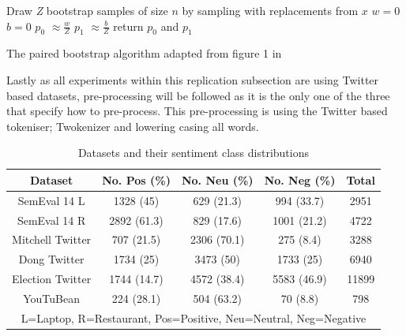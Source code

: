 \begin{algorithm}
    Draw \textit{Z} bootstrap samples of size $n$ by sampling with replacements from $x$\;
    $w = 0$\;
    $b = 0$\;
    $p_0$ $\approx \frac{w}{Z}$\;
    $p_1$ $\approx \frac{b}{Z}$\;
    return $p_0$ and $p_1$\;
    \caption{The paired bootstrap algorithm adapted from figure 1 in \citet{repro_berg_2012}}
    \label{algo:repro_bootstrap}
\end{algorithm}
Lastly as all experiments within this replication subsection are using Twitter based datasets, \citet{repro_vo_2015} pre-processing will be followed as it is the only one of the three that specify how to pre-process. This pre-processing is using the Twitter based tokeniser; Twokenizer \citep{repro_gimpel_2011} and lowering casing all words.

\begin{table}[]
    \centering
    \begin{tabular}{|c|c|c|c|c|}
        \hline
        Dataset & No. Pos (\%) & No. Neu (\%) & No. Neg (\%) & Total\\
        \hline
        SemEval 14 L & 1328 (45) & 629 (21.3) & 994 (33.7) & 2951 \\
        \hline
        SemEval 14 R & 2892 (61.3) & 829 (17.6) & 1001 (21.2) & 4722 \\
        \hline
        Mitchell Twitter & 707 (21.5) & 2306 (70.1) & 275 (8.4) & 3288 \\
        \hline
        Dong Twitter & 1734 (25) & 3473 (50) & 1733 (25) & 6940 \\
        \hline 
        Election Twitter & 1744 (14.7) & 4572 (38.4) & 5583 (46.9) & 11899 \\
        \hline 
        YouTuBean & 224 (28.1) & 504 (63.2) & 70 (8.8) & 798 \\
        \hline
        \multicolumn{5}{|p{\linewidth}|}{L=Laptop, R=Restaurant, Pos=Positive, Neu=Neutral, Neg=Negative}\\
        \hline
    \end{tabular}
    \caption{Datasets and their sentiment class distributions}
    \label{table:repro_dataset_sent_dist}
\end{table}

